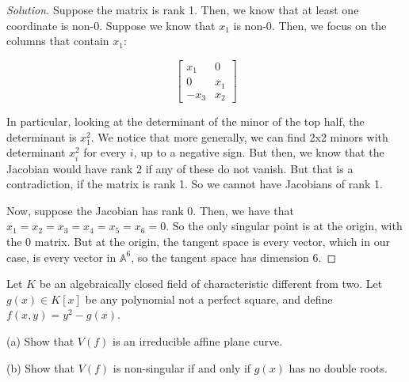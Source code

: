 \documentclass[10pt]{article}
\newenvironment{problem}[2][Problem]{\begin{trivlist}
\item[\hskip \labelsep {\bfseries #1}\hskip \labelsep {\bfseries #2.}]}{\end{trivlist}}
\begin{document}
\begin{proof}[Solution]
Suppose the matrix is rank 1. Then, we know that at least one coordinate is non-0. Suppose we know that $x_1$ is non-0. Then, we focus on the columns that contain $x_1$:

$$ \begin{bmatrix} x_1 & 0 \\ 0 & x_1 \\ -x_3 & x_2 \end{bmatrix} $$

In particular, looking at the determinant of the minor of the top half, the determinant is $x_1^2$. We notice that more generally, we can find 2x2 minors with determinant $x_i^2$ for every $i$, up to a negative sign. But then, we know that the Jacobian would have rank 2 if any of these do not vanish. But that is a contradiction, if the matrix is rank 1. So we cannot have Jacobians of rank 1.

Now, suppose the Jacobian has rank 0. Then, we have that $x_1 = x_2 = x_3 = x_4 = x_5 = x_6 = 0$. So the only singular point is at the origin, with the $0$ matrix. But at the origin, the tangent space is every vector, which in our case, is every vector in $\mathbb{A}^6$, so the tangent space has dimension 6.

\end{proof}

\begin{problem}{8.2}

Let $K$ be an algebraically closed field of characteristic different from two. Let $g(x) \in K[x]$ be any polynomial not a perfect square, and define $f(x,y) = y^2 - g(x)$.

(a) Show that $V(f)$ is an irreducible affine plane curve.

(b) Show that $V(f)$ is non-singular if and only if $g(x)$ has no double roots.

\end{problem}
\end{document}
